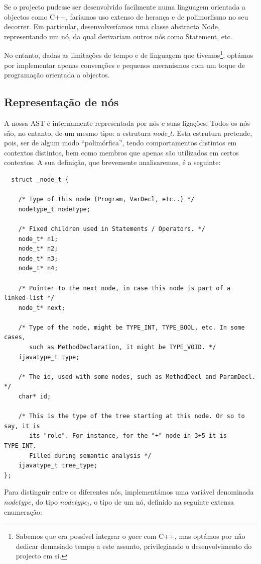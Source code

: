 \documentclass[11pt,a4paper]{article}
\begin{document}
Se o projecto pudesse ser desenvolvido facilmente numa linguagem orientada a objectos como C++, faríamos uso extenso de herança e de polimorfismo no seu decorrer. Em particular, desenvolveríamos uma classe abstracta Node, representando um nó, da qual derivariam outros nós como Statement, etc.

No entanto, dadas as limitações de tempo e de linguagem que tivemos\footnote{Sabemos que era possível integrar o $yacc$ com C++, mas optámos por não dedicar demasiado tempo a este assunto, privilegiando o desenvolvimento do projecto em si. }, optámos por implementar apenas convenções e pequenos mecanismos com um toque de programação orientada a objectos.

\subsection{Representação de nós}

A nossa AST é internamente representada por nós e suas ligações. Todos os nós são, no entanto, de um mesmo tipo: a estrutura $node\_t$. Esta estrutura pretende, pois, ser de algum modo ``polimórfica'', tendo comportamentos distintos em contextos distintos, bem como membros que apenas são utilizados em certos contextos. A sua definição, que brevemente analisaremos, é a seguinte:

\begin{lstlisting}
  struct _node_t {

    /* Type of this node (Program, VarDecl, etc..) */
    nodetype_t nodetype;

    /* Fixed children used in Statements / Operators. */
    node_t* n1;
    node_t* n2;
    node_t* n3;
    node_t* n4;

    /* Pointer to the next node, in case this node is part of a linked-list */
    node_t* next;

    /* Type of the node, might be TYPE_INT, TYPE_BOOL, etc. In some cases,
       such as MethodDeclaration, it might be TYPE_VOID. */
    ijavatype_t type;

    /* The id, used with some nodes, such as MethodDecl and ParamDecl. */     
    char* id;

    /* This is the type of the tree starting at this node. Or so to say, it is
       its "role". For instance, for the "+" node in 3+5 it is TYPE_INT.
       Filled during semantic analysis */
    ijavatype_t tree_type;
};
\end{lstlisting}

Para distinguir entre os diferentes nós, implementámos uma variável denominada $nodetype$, do tipo $nodetype_t$, o tipo de um nó, definido na seguinte extensa enumeração:
\end{document}
